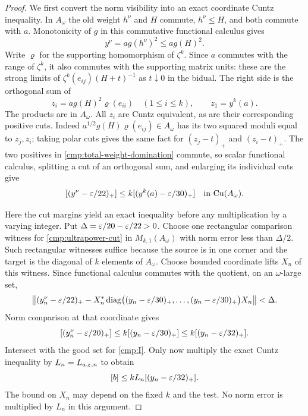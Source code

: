 \begin{proof}
We first convert the norm visibility into an exact coordinate
Cuntz inequality.  In $A_\omega$ the old weight $h^\nu$ and $H$
commute, $h^\nu\le H$, and both commute with $a$.  Monotonicity of
$g$ in this commutative functional calculus gives
\begin{equation}\label{cmp:total-weight-domination}
 y^\nu=ag(h^\nu)^2\le ag(H)^2.
\end{equation}
Write $\varrho$ for the supporting homomorphism of $\zeta^k$.
Since $a$ commutes with the range of $\zeta^k$, it also commutes
with the supporting matrix units: these are the strong limits of
$\zeta^k(e_{ij})(H+t)^{-1}$ as $t\downarrow0$ in the bidual.
The right side is the orthogonal sum of
\[
 z_i=ag(H)^2\varrho(e_{ii})\quad(1\le i\le k),
 \qquad z_1=y^k(a).
\]
The products are in $A_\omega$.  All $z_i$ are Cuntz equivalent,
as are their corresponding positive cuts.  Indeed
$a^{1/2}g(H)\varrho(e_{ij})\in A_\omega$ has its two squared
moduli equal to $z_j,z_i$; taking polar cuts gives the same fact
for $(z_j-t)_+$ and $(z_i-t)_+$.  The two positives in
\eqref{cmp:total-weight-domination} commute, so scalar functional
calculus, splitting a cut of an orthogonal sum, and enlarging its
individual cuts give
\begin{equation}\label{cmp:ultrapower-cut}
 [(y^\nu-\varepsilon/22)_+]
       \le k[(y^k(a)-\varepsilon/30)_+]
       \quad\text{in }\mathrm{Cu}(A_\omega).
\end{equation}

Here the cut margins yield an exact inequality before any
multiplication by a varying integer.  Put
$\Delta=\varepsilon/20-\varepsilon/22>0$.
Choose one rectangular comparison witness for
\eqref{cmp:ultrapower-cut} in $M_{k,1}(A_\omega)$ with norm error
less than $\Delta/2$.  Such rectangular witnesses suffice because
the source is in one corner and the target is the diagonal of
$k$ elements of $A_\omega$.  Choose bounded coordinate lifts $X_n$
of this witness.  Since functional calculus commutes with the
quotient, on an $\omega$-large set,
\[
 \left\|(y_n^\nu-\varepsilon/22)_+
       -X_n^*\operatorname{diag}\bigl((y_n-\varepsilon/30)_+,
                           \ldots,(y_n-\varepsilon/30)_+\bigr)X_n
 \right\|<\Delta.
\]
Norm comparison at that coordinate gives
\[
 [(y_n^\nu-\varepsilon/20)_+]
 \le k[(y_n-\varepsilon/30)_+]
 \le k[(y_n-\varepsilon/32)_+].
\]
Intersect with the good set for \eqref{cmp:I}.  Only now multiply
the exact Cuntz inequality by $L_n=L_{a,\varepsilon,n}$ to obtain
\begin{equation}\label{cmp:exact-coordinate-bound}
 [b]\le kL_n[(y_n-\varepsilon/32)_+].
\end{equation}
The bound on $X_n$ may depend on the fixed $k$ and the test.  No
norm error is multiplied by $L_n$ in this argument.


\end{proof}
